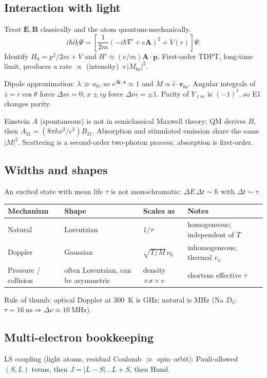 \documentclass[11pt,a4paper]{article}
\begin{document}
\subsection{Interaction with light}
Treat \(\mathbf{E},\mathbf{B}\) classically and the atom quantum-mechanically.
\[
i\hbar\partial_t\Psi=\left[\frac{1}{2m}(-i\hbar\nabla+e\mathbf{A})^2+V(r)\right]\Psi.
\]
Identify \(H_0=p^2/2m+V\) and \(H'\approx (e/m)\mathbf{A}\cdot\mathbf{p}\). First-order TDPT, long-time limit, produces a rate \(\propto\) (intensity) \(\times|M_{ba}|^2\).

Dipole approximation: \(\lambda\gg a_0\), so \(e^{i\mathbf{k}\cdot\mathbf{r}}\approx 1\) and \(M\propto\hat\epsilon\cdot\mathbf{r}_{ba}\). Angular integrals of \(z=r\cos\theta\) force \(\Delta m=0\); \(x\pm iy\) force \(\Delta m=\pm 1\). Parity of \(Y_{\ell m}\) is \((-1)^\ell\), so E1 changes parity.

Einstein \(A\) (spontaneous) is not in semiclassical Maxwell theory; QM derives \(B\), then \(A_{21}=(8\pi h\nu^3/c^3)B_{21}\). Absorption and stimulated emission share the same \(|M|^2\). Scattering is a second-order two-photon process; absorption is first-order.

\subsection{Widths and shapes}
An excited state with mean life \(\tau\) is not monochromatic: \(\Delta E\,\Delta t\sim\hbar\) with \(\Delta t\sim\tau\).

\begin{center}
\small
\begin{tabular}{@{}llll@{}}
\toprule
Mechanism & Shape & Scales as & Notes \\
\midrule
Natural & Lorentzian & \(1/\tau\) & homogeneous; independent of \(T\) \\
Doppler & Gaussian & \(\sqrt{T/M}\,\nu_0\) & inhomogeneous; thermal \(v_x\) \\
Pressure / collision & often Lorentzian, can be asymmetric & density \(\times\sigma\times v\) & shortens effective \(\tau\) \\
\bottomrule
\end{tabular}
\end{center}
Rule of thumb: optical Doppler at 300~K is GHz; natural is MHz (Na \(D_2\): \(\tau=16~\mathrm{ns}\Rightarrow\Delta\nu\approx 10~\mathrm{MHz}\)).

\subsection{Multi-electron bookkeeping}
LS coupling (light atoms, residual Coulomb \(\gg\) spin--orbit): Pauli-allowed \((S,L)\) terms, then \(J=|L-S|\ldots L+S\), then Hund.
\end{document}
